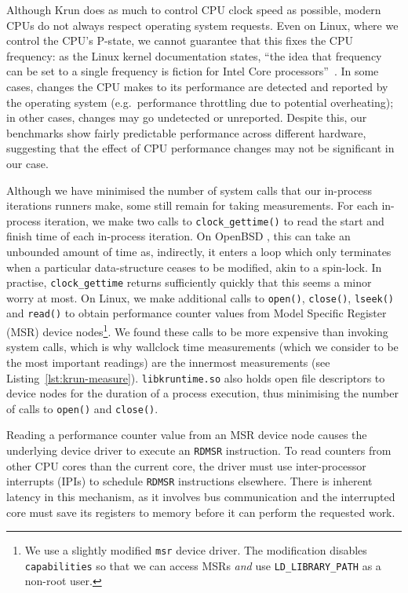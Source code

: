\documentclass[preprint,numbers,10pt]{sigplanconf}
\newcommand{\krun}{Krun\xspace}
\begin{document}
Although \krun does as much to control CPU clock speed as possible, modern CPUs
do not always respect operating system requests. Even on Linux, where we control
the CPU's P-state, we cannot guarantee that this fixes the CPU frequency: as
the Linux kernel documentation states, ``the idea that frequency can be set to a single
frequency is fiction for Intel Core processors''~\cite{pstate}. In
some cases, changes the CPU makes to its performance are detected and reported
by the operating system (e.g.~performance throttling due to potential
overheating); in other cases, changes may go undetected or unreported.
Despite this, our benchmarks show fairly predictable performance across
different hardware, suggesting that the effect of CPU performance changes may
not be significant in our case.

Although we have minimised the number of system calls that our in-process
iterations runners make, some still remain for taking measurements. For each
in-process iteration, we make two calls to \texttt{clock\_gettime()} to
read the start and finish time of each in-process iteration. On OpenBSD
, this can take an
unbounded amount of time as, indirectly, it enters a loop which only terminates
when a particular data-structure ceases to be modified, akin to a spin-lock. In
practise, \texttt{clock\_gettime} returns sufficiently quickly that this seems a
minor worry at most.
On Linux, we make additional calls to \texttt{open()}, \texttt{close()},
\texttt{lseek()} and \texttt{read()} to obtain performance counter values from
Model Specific Register (MSR) device nodes\footnote{We use a slightly modified
    \texttt{msr} device driver. The modification disables \texttt{capabilities}
so that we can access MSRs \emph{and} use \texttt{LD\_LIBRARY\_PATH} as a
non-root user.}. We found these calls to be more expensive than invoking system
calls, which is why wallclock time measurements (which we consider to be the
most important readings) are the innermost measurements (see
Listing~\ref{lst:krun-measure}). \texttt{libkruntime.so} also holds open file
descriptors to device nodes for the duration of a process execution, thus
minimising the number of calls to \texttt{open()} and \texttt{close()}.

Reading a performance counter value from an MSR device node causes the
underlying device driver to execute an \texttt{RDMSR} instruction. To read
counters from other CPU cores than the current core, the driver must use
inter-processor interrupts (IPIs) to schedule \texttt{RDMSR} instructions
elsewhere. There is inherent latency in this mechanism, as it involves bus
communication and the interrupted core must save its registers to memory before
it can perform the requested work.
\end{document}
